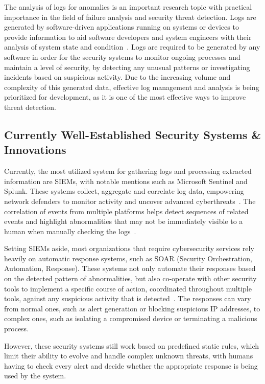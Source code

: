 \documentclass[12pt,a4paper]{report}
\begin{document}
The analysis of logs for anomalies is an important research topic with practical importance in
the field of failure analysis and security threat detection. Logs are generated by software-driven
applications running on systems or devices to provide information to aid software developers and
system engineers with their analysis of system state and condition~\cite{ref15}. Logs are
required to be generated by any software in order for the security systems to monitor ongoing
processes and maintain a level of security, by detecting any unusual patterns or investigating
incidents based on suspicious activity. Due to the increasing volume and complexity of this
generated data, effective log management and analysis is being prioritized for development, as it
is one of the most effective ways to improve threat detection.

\subsection{Currently Well-Established Security Systems \& Innovations}

Currently, the most utilized system for gathering logs and processing extracted information are
SIEMs, with notable mentions such as Microsoft Sentinel and Splunk. These systems collect,
aggregate and correlate log data, empowering network defenders to monitor activity and uncover
advanced cyberthreats~\cite{ref16}. The correlation of events from multiple platforms helps
detect sequences of related events and highlight abnormalities that may not be immediately visible
to a human when manually checking the logs~\cite{ref17}.

Setting SIEMs aside, most organizations that require cybersecurity services rely heavily on
automatic response systems, such as SOAR (Security Orchestration, Automation, Response). These
systems not only automate their responses based on the detected pattern of abnormalities, but
also co-operate with other security tools to implement a specific course of action, coordinated
throughout multiple tools, against any suspicious activity that is detected~\cite{ref16}. The
responses can vary from normal ones, such as alert generation or blocking suspicious IP addresses,
to complex ones, such as isolating a compromised device or terminating a malicious process.

However, these security systems still work based on predefined static rules, which limit their
ability to evolve and handle complex unknown threats, with humans having to check every alert
and decide whether the appropriate response is being used by the system.
\end{document}
